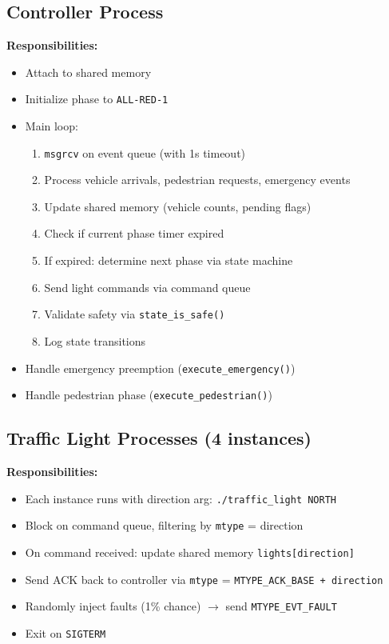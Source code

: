 \documentclass[11pt,a4paper]{article}
\begin{document}
\subsection{Controller Process}
\textbf{Responsibilities:}
\begin{itemize}[noitemsep]
    \item Attach to shared memory
    \item Initialize phase to \texttt{ALL-RED-1}
    \item Main loop:
    \begin{enumerate}[noitemsep]
        \item \texttt{msgrcv} on event queue (with 1s timeout)
        \item Process vehicle arrivals, pedestrian requests, emergency events
        \item Update shared memory (vehicle counts, pending flags)
        \item Check if current phase timer expired
        \item If expired: determine next phase via state machine
        \item Send light commands via command queue
        \item Validate safety via \texttt{state\_is\_safe()}
        \item Log state transitions
    \end{enumerate}
    \item Handle emergency preemption (\texttt{execute\_emergency()})
    \item Handle pedestrian phase (\texttt{execute\_pedestrian()})
\end{itemize}

\subsection{Traffic Light Processes (4 instances)}
\textbf{Responsibilities:}
\begin{itemize}[noitemsep]
    \item Each instance runs with direction arg: \texttt{./traffic\_light NORTH}
    \item Block on command queue, filtering by \texttt{mtype} = direction
    \item On command received: update shared memory \texttt{lights[direction]}
    \item Send ACK back to controller via \texttt{mtype} = \texttt{MTYPE\_ACK\_BASE + direction}
    \item Randomly inject faults (1\% chance) $\rightarrow$ send \texttt{MTYPE\_EVT\_FAULT}
    \item Exit on \texttt{SIGTERM}
\end{itemize}
\end{document}
